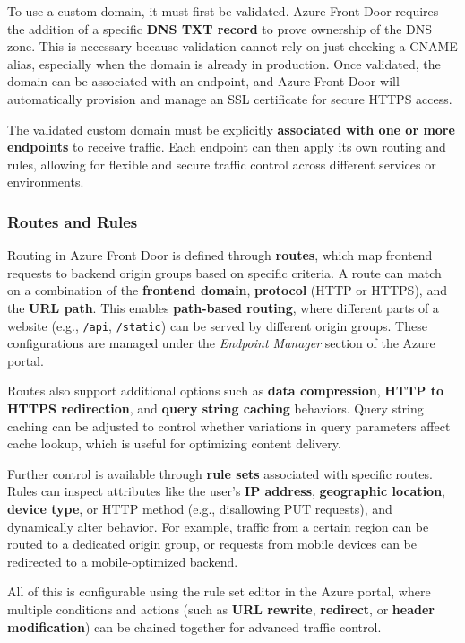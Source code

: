 \documentclass[12pt]{article}
\begin{document}
To use a custom domain, it must first be validated. Azure Front Door requires the addition of a specific \textbf{DNS TXT record} to prove ownership of the DNS zone. This is necessary because validation cannot rely on just checking a CNAME alias, especially when the domain is already in production. Once validated, the domain can be associated with an endpoint, and Azure Front Door will automatically provision and manage an SSL certificate for secure HTTPS access.

The validated custom domain must be explicitly \textbf{associated with one or more endpoints} to receive traffic. Each endpoint can then apply its own routing and rules, allowing for flexible and secure traffic control across different services or environments.

\subsubsection{Routes and Rules}

Routing in Azure Front Door is defined through \textbf{routes}, which map frontend requests to backend origin groups based on specific criteria. A route can match on a combination of the \textbf{frontend domain}, \textbf{protocol} (HTTP or HTTPS), and the \textbf{URL path}. This enables \textbf{path-based routing}, where different parts of a website (e.g., \texttt{/api}, \texttt{/static}) can be served by different origin groups. These configurations are managed under the \textit{Endpoint Manager} section of the Azure portal.

Routes also support additional options such as \textbf{data compression}, \textbf{HTTP to HTTPS redirection}, and \textbf{query string caching} behaviors. Query string caching can be adjusted to control whether variations in query parameters affect cache lookup, which is useful for optimizing content delivery.

Further control is available through \textbf{rule sets} associated with specific routes. Rules can inspect attributes like the user’s \textbf{IP address}, \textbf{geographic location}, \textbf{device type}, or HTTP method (e.g., disallowing PUT requests), and dynamically alter behavior. For example, traffic from a certain region can be routed to a dedicated origin group, or requests from mobile devices can be redirected to a mobile-optimized backend.

All of this is configurable using the rule set editor in the Azure portal, where multiple conditions and actions (such as \textbf{URL rewrite}, \textbf{redirect}, or \textbf{header modification}) can be chained together for advanced traffic control.
\end{document}
